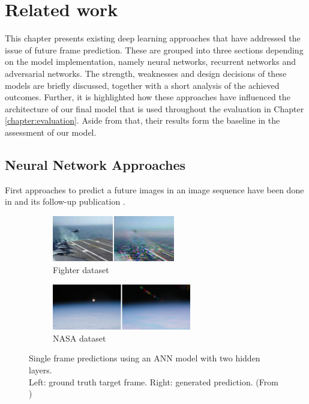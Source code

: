 
\chapter{Related work}  \label{chapter:relatedwork}

This chapter presents existing deep learning approaches that have addressed the issue of future frame prediction. These are grouped into three sections depending on the model implementation, namely neural networks, recurrent networks and adversarial networks. The strength, weaknesses and design decisions of these models are briefly discussed, together with a short analysis of the achieved outcomes. Further, it is highlighted how these approaches have influenced the architecture of our final model that is used throughout the evaluation in Chapter \ref{chapter:evaluation}. Aside from that, their results form the baseline in the assessment of our model.


\section{Neural Network Approaches}

First approaches to predict a future images in an image sequence have been done in \parencite{ann} and its follow-up publication \parencite{ann2}.

\begin{figure}[htb]
\centering
\begin{subfigure}{0.5\textwidth}
  \centering
  \includegraphics[height=2cm]{figures/related/fighter.png}
  \caption{Fighter dataset}
  \label{fig:aan_samples_fighter}
\end{subfigure}%
\begin{subfigure}{0.5\textwidth}
  \centering
  \includegraphics[height=2cm]{figures/related/nasa.png}
  \caption{NASA dataset}
  \label{fig:aan_samples_nasa}
\end{subfigure}
\caption[ANN Frame Prediction]{Single frame predictions using an ANN model with two hidden layers.\\
Left: ground truth target frame. Right: generated prediction.  (From \parencite{ann})}
\label{fig:aan_samples}
\end{figure}




